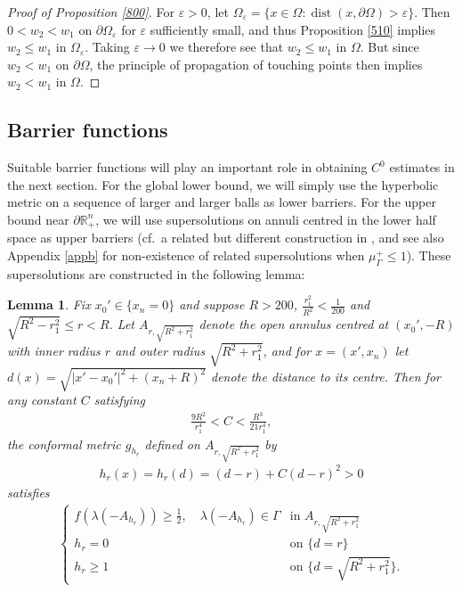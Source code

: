 \documentclass[12pt]{article}
\numberwithin{equation}{section}
\theoremstyle{plain}
\newtheorem{lem}[thm]{Lemma}
\theoremstyle{definition}
\newcommand{\ep}{\varepsilon}
\begin{document}
\begin{proof}[Proof of Proposition \ref{800}]
	For $\ep>0$, let $\Omega_\ep = \{x\in\Omega:\operatorname{dist}(x,\partial\Omega)>\ep\}$. Then $0<w_2 < w_1$ on $\partial\Omega_\ep$ for $\ep$ sufficiently small, and thus Proposition \ref{510} implies $w_2 \leq w_1$ in $\Omega_\ep$. Taking $\ep\rightarrow 0$ we therefore see that $w_2 \leq w_1$ in $\Omega$. But since $w_2<w_1$ on $\partial\Omega$, the principle of propagation of touching points \cite[Theorem 3.2]{LNW18} then implies $w_2<w_1$ in $\Omega$. 
\end{proof}



	



\subsection{Barrier functions}\label{bar}

Suitable barrier functions will play an important role in obtaining $C^0$ estimates in the next section. For the global lower bound, we will simply use the hyperbolic metric on a sequence of larger and larger balls as lower barriers. For the upper bound near $\partial\mathbb{R}_+^n$, we will use supersolutions on annuli centred in the lower half space as upper barriers (cf.~a related but different construction in \cite[Proposition 3.4]{DN23}, and see also Appendix \ref{appb} for non-existence of related supersolutions when $\mu_\Gamma^+ \leq 1$). These supersolutions are constructed in the following lemma:

\begin{lem}\label{l3}
	Fix $x_0'\in\{x_n=0\}$ and suppose $R>200$, $\frac{r_1^2}{R^2} < \frac{1}{200}$ and $ \sqrt{R^2 - r_1^2} \leq r < R$. Let $A_{r, \sqrt{R^2 + r_1^2}}$ denote the open annulus centred at $(x_0', -R)$ with inner radius $r$ and outer radius $\sqrt{R^2 + r_1^2}$, and for $x = (x',x_n)$ let $d(x) = \sqrt{|x' - x_0'|^2 + (x_n + R)^2}$ denote the distance to its centre. Then for any constant $C$ satisfying
	\begin{align}\label{11}
	\frac{9R^2}{r_1^4} < C < \frac{R^3}{21r_1^4}, 
	\end{align}
	the conformal metric $g_{h_{r}}$ defined on $A_{r, \sqrt{R^2 + r_1^2}}$ by
	\begin{align*}
	h_{r}(x) = h_{r}(d) = (d-r) + C(d-r)^2 > 0 
	\end{align*}
	satisfies
	\begin{align*}
	\begin{cases}
	f(\lambda(-A_{h_{r}})) \geq \frac{1}{2}, \quad \lambda(-A_{h_r})\in\Gamma & \text{in }A_{r, \sqrt{R^2 + r_1^2}} \\
	h_{r} = 0 & \text{on }\{d=r\} \\
	h_{r} \geq 1 & \text{on }\{d=\sqrt{R^2 + r_1^2}\}. 
	\end{cases}
	\end{align*}
\end{lem}
\end{document}
